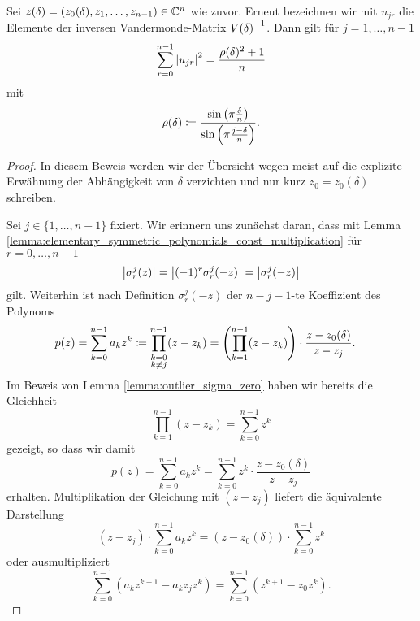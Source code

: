 \begin{lemma}
    \label{lemma:inverse_outlier_nonzero_row_quadratic_sum}
    Sei $z(\delta) = (z_0(\delta), z_1, \dots, z_{n-1}) \in \mathbb{C}^n$ wie zuvor.
    Erneut bezeichnen wir mit $u_{jr}$ die Elemente der inversen
    Vandermonde-Matrix $V \! \left( \delta \right)^{-1}$.
    Dann gilt für ${j = 1, \dots, n-1}$
    \begin{equation}
        \sum_{r=0}^{n-1} \left\lvert u_{jr} \right\rvert^2
        = \frac{\rho(\delta)^2 + 1}{n}
    \end{equation}
    mit
    \[
        \rho(\delta) \coloneqq \frac{\sin \left( \pi \frac{\delta}{n} \right)}{\sin \left( \pi \frac{j - \delta}{n} \right)}.
    \]
\end{lemma}
\begin{proof}
    In diesem Beweis werden wir der Übersicht wegen meist auf die explizite
    Erwähnung der Abhängigkeit von $\delta$ verzichten und nur kurz
    $z_0 = z_0(\delta)$ schreiben.

    \noindent Sei $j \in \{1, \dots, n-1\}$ fixiert.
    Wir erinnern uns zunächst daran, dass mit Lemma
    \ref{lemma:elementary_symmetric_polynomials_const_multiplication}
    für ${r = 0, \dots, n-1}$
    \[
        \left\lvert  \sigma_r^j (z) \right\rvert
        = \left\lvert (-1)^r \sigma_r^j (-z)  \right\rvert
        = \left\lvert \sigma_r^j (-z)  \right\rvert
    \]
    gilt.
    Weiterhin ist nach Definition $\sigma_r^j (-z)$ der $n\!-\!j\!-\!1$-te
    Koeffizient des Polynoms
    \[
        \begin{split}
            p(z)
            &= \sum_{k=0}^{n-1} a_k z^k
            \coloneqq \prod_{\substack{k=0 \\ k\neq j}}^{n-1} (z-z_k)
            = \left( \prod_{k=1}^{n-1} (z-z_k) \right) \cdot \frac{z-z_0(\delta)}{z-z_j}.
        \end{split}
    \]
    Im Beweis von Lemma
    \ref{lemma:outlier_sigma_zero}
    haben wir bereits die Gleichheit
    \[
        \prod_{k=1}^{n-1} (z-z_k) = \sum_{k=0}^{n-1} z^k
    \]
    gezeigt, so dass wir damit
    \[
        p(z)
        = \sum_{k=0}^{n-1} a_k z^k
        = \sum_{k=0}^{n-1} z^k \cdot \frac{z-z_0(\delta)}{z-z_j}
    \]
    erhalten.
    Multiplikation der Gleichung mit $(z-z_j)$ liefert die äquivalente
    Darstellung
    \[
        (z-z_j) \cdot \sum_{k=0}^{n-1} a_k z^k
        = (z-z_0(\delta)) \cdot \sum_{k=0}^{n-1} z^k
    \]
    oder ausmultipliziert
    \[
        \sum_{k=0}^{n-1} \left( a_k z^{k+1} - a_k z_j z^k \right)
        = \sum_{k=0}^{n-1} \left( z^{k+1} - z_0 z^k \right).
    \]


\end{proof}
